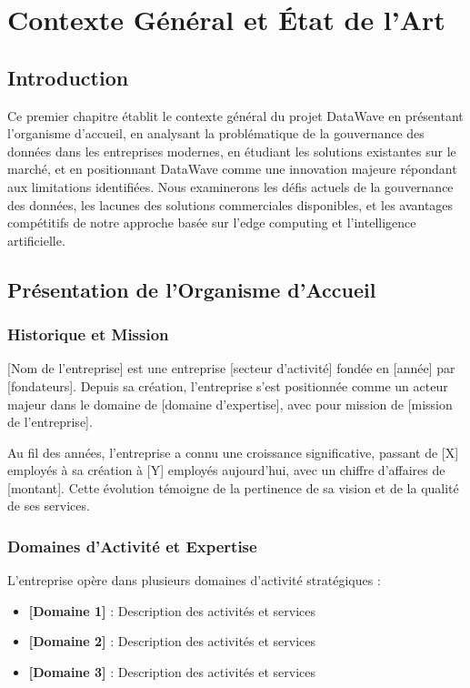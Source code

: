 \chapter{Contexte Général et État de l'Art}

\section*{Introduction}

Ce premier chapitre établit le contexte général du projet DataWave en présentant l'organisme d'accueil, en analysant la problématique de la gouvernance des données dans les entreprises modernes, en étudiant les solutions existantes sur le marché, et en positionnant DataWave comme une innovation majeure répondant aux limitations identifiées. Nous examinerons les défis actuels de la gouvernance des données, les lacunes des solutions commerciales disponibles, et les avantages compétitifs de notre approche basée sur l'edge computing et l'intelligence artificielle.

\section{Présentation de l'Organisme d'Accueil}

\subsection{Historique et Mission}

[Nom de l'entreprise] est une entreprise [secteur d'activité] fondée en [année] par [fondateurs]. Depuis sa création, l'entreprise s'est positionnée comme un acteur majeur dans le domaine de [domaine d'expertise], avec pour mission de [mission de l'entreprise].

Au fil des années, l'entreprise a connu une croissance significative, passant de [X] employés à sa création à [Y] employés aujourd'hui, avec un chiffre d'affaires de [montant]. Cette évolution témoigne de la pertinence de sa vision et de la qualité de ses services.

\subsection{Domaines d'Activité et Expertise}

L'entreprise opère dans plusieurs domaines d'activité stratégiques :
\begin{itemize}
    \item \textbf{[Domaine 1]} : Description des activités et services
    \item \textbf{[Domaine 2]} : Description des activités et services
    \item \textbf{[Domaine 3]} : Description des activités et services
\end{itemize}

